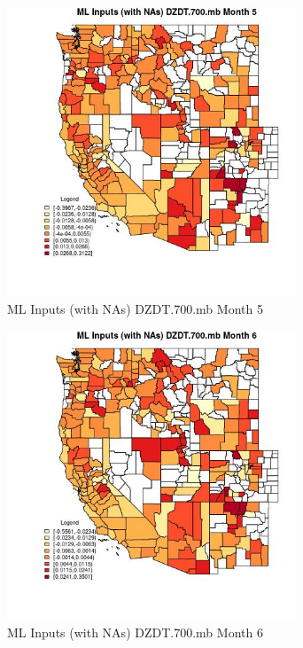 \begin{figure} 
\centering  
\includegraphics[width=0.77\textwidth]{Code_Outputs/Report_ML_input_PM25_Step4_part_e_de_duplicated_aves_compiled_2019-05-21wNAs_CountyDZDT700mbmedianMonth5.jpg} 
\caption{\label{fig:Report_ML_input_PM25_Step4_part_e_de_duplicated_aves_compiled_2019-05-21wNAsCountyDZDT700mbmedianMonth5}ML Inputs (with NAs) DZDT.700.mb Month 5} 
\end{figure} 
 

\begin{figure} 
\centering  
\includegraphics[width=0.77\textwidth]{Code_Outputs/Report_ML_input_PM25_Step4_part_e_de_duplicated_aves_compiled_2019-05-21wNAs_CountyDZDT700mbmedianMonth6.jpg} 
\caption{\label{fig:Report_ML_input_PM25_Step4_part_e_de_duplicated_aves_compiled_2019-05-21wNAsCountyDZDT700mbmedianMonth6}ML Inputs (with NAs) DZDT.700.mb Month 6} 
\end{figure} 
 

